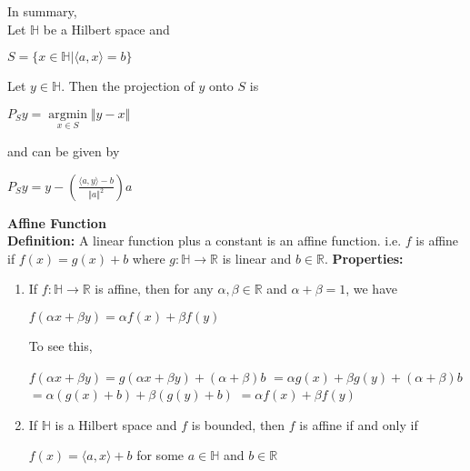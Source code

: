 \documentclass{article}
\begin{document}
\pagebreak

In summary, \\
Let $\mathbb{H}$ be a Hilbert space and 
\begin{center}
    $S = \{x \in \mathbb{H}|\langle a,x \rangle = b\}$
\end{center}
Let $y \in \mathbb{H}$. Then the projection of $y$ onto $S$ is 
\begin{center}
    $P_Sy = \underset{x \in S}{\operatorname*{argmin}} \Vert y - x \Vert$
\end{center}
and can be given by
\begin{center}
    $P_Sy = y - (\frac{\langle a, y \rangle -b}{\Vert a \Vert^2})a$
\end{center}

\textbf{Affine Function} \\
\textbf{Definition:} A linear function plus a constant is an affine function. i.e. $f$ is affine if $f(x) = g(x) + b$ where $g: \mathbb{H} \to \mathbb{R}$ is linear and $b \in \mathbb{R}$. 
\bigbreak
\textbf{Properties:}
\begin{enumerate}
    \item If $f: \mathbb{H} \to \mathbb{R}$ is affine, then for any $\alpha, \beta \in \mathbb{R}$ and $\alpha + \beta = 1$, we have 
    \begin{center}
        $f(\alpha x + \beta y) = \alpha f(x) + \beta f(y)$
    \end{center}
    To see this, 
    \begin{center}
        $f(\alpha x + \beta y) = g(\alpha x + \beta y) + (\alpha + \beta) b$ \bigbreak
        $= \alpha g(x) + \beta g(y) + (\alpha + \beta) b$ \bigbreak
        $= \alpha (g(x) + b) + \beta (g(y) + b)$ \bigbreak
        $= \alpha f(x) + \beta f(y)$
    \end{center}
    \item If $\mathbb{H}$ is a Hilbert space and $f$ is bounded, then $f$ is affine if and only if 
    \begin{center}
        $f(x) = \langle a, x \rangle + b$ for some $a \in \mathbb{H}$ and $b \in \mathbb{R}$
    \end{center}
\end{enumerate}
\end{document}
